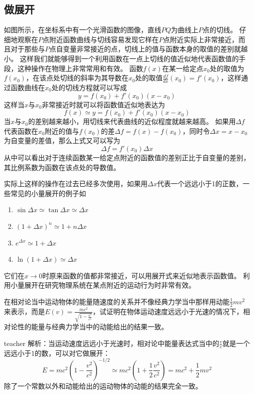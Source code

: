 \subsection{做展开}
如图所示，在坐标系中有一个光滑函数的图像，直线$PQ$为曲线上$P$点的切线。
仔细地观察在$P$点附近函数曲线与切线容易发现它样在$P$点附近实际上非常接近，而且对于那些与$P$点自变量非常接近的点，切线上的值与函数本身的取值的差别就越小。
这样我们就能够得到一个利用函数在一点上切线的值近似地代表函数值的手段，这种操作在物理上非常常用和有效。
函数$f(x)$在某一给定点$x_0$处的取值为$f(x_0)$，在该点处切线的斜率为其导数在$x_0$处的取值$\frac{df}{dx}(x_0)=f'(x_0)$，这样通过函数曲线在$x_0$处的切线方程就可以写成
\begin{equation}
y = f(x_0)+f'(x_0)(x-x_0)
\end{equation}
这样当$x$与$x_0$非常接近时就可以将函数值近似地表达为
\begin{equation}
f(x)\simeq y  = f(x_0)+f'(x_0)(x-x_0)
\end{equation}
当$x$与$x_0$的差别越来越小，用切线来代表曲线的近似程度就越来越高。
如果用$\Delta f$代表函数在$x_0$附近的值与$f(x_0)$的差$\Delta f = f(x)-f(x_0)$，同时令$\Delta x = x-x_0$为自变量的差值，那么上式又可以写为
\begin{equation}
\Delta f = f'(x_0)\Delta x
\end{equation}
从中可以看出对于连续函数某一给定点附近的函数值的差别正比于自变量的差别，其比例系数为函数在该点处的导数值。

实际上这样的操作在过去已经多次使用，如果用$\Delta x$代表一个远远小于1的正数，一些常见的小量展开的例子如
\begin{enumerate}
\item $\sin \Delta x\simeq\tan \Delta x\simeq  \Delta x$
\item $(1+\Delta x)^n\simeq 1+n\Delta x$
\item $e^{\Delta x}\simeq 1+\Delta x$
\item $\ln (1+\Delta x)\simeq \Delta x$
\end{enumerate}
它们在$x\rightarrow 0$时原来函数的值都非常接近，可以用展开式来近似地表示函数值。
利用小量展开在研究物理系统在某点附近的运动行为时非常有效。





\begin{example}
在相对论当中运动物体的能量随速度的关系并不像经典力学当中那样用动能$\frac{1}{2}mv^2$来表示，而是$E(v)=\frac{mc^2}{\sqrt{1-\frac{v^2}{c^2}}}$，试证明在物体运动速度远远小于光速的情况下，相对论性的能量与经典力学当中的动能给出的结果一致。
\begin{taggedblock}{teacher}
\newline
解析：当运动速度远远小于光速时，相对论中能量表达式当中的$\frac{v}{c}$就是一个远远小于1的数，可以对它做展开：
\[
E = mc^2\left (1-\frac{v^2}{c^2}\right )^{-1/2}\simeq mc^2(1+\frac{1}{2}\frac{v^2}{c^2})=mc^2+\frac{1}{2}mv^2
\]
除了一个常数以外和动能给出的运动物体的动能的结果完全一致。
\end{taggedblock}
\end{example}

